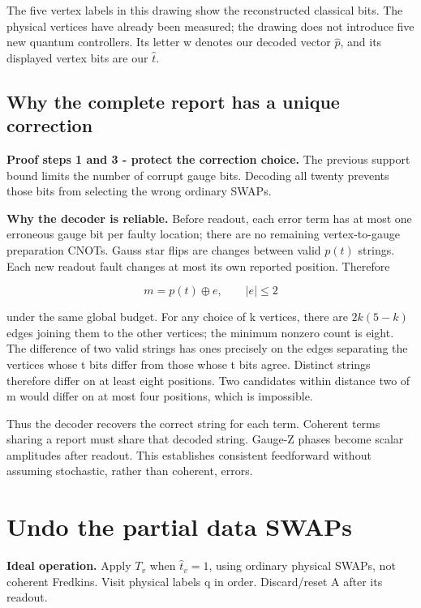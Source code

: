 \documentclass[11pt]{article}
\begin{document}
The five vertex labels in this drawing show the reconstructed classical bits. The physical vertices have already been measured; the drawing does not introduce five new quantum controllers. Its letter w denotes our decoded vector \(\widehat p\), and its displayed vertex bits are our \(\widehat t\).

\subsection{Why the complete report has a unique correction}
\textbf{Proof steps 1 and 3 - protect the correction choice.} The previous support bound limits the number of corrupt gauge bits. Decoding all twenty prevents those bits from selecting the wrong ordinary SWAPs.

\textbf{Why the decoder is reliable.} Before readout, each error term has at most one erroneous gauge bit per faulty location; there are no remaining vertex-to-gauge preparation CNOTs. Gauss star flips are changes between valid \(p(t)\) strings. Each new readout fault changes at most its own reported position. Therefore

\[
m=p(t)\oplus e,\qquad |e|\le2
\]

under the same global budget. For any choice of k vertices, there are \(2k(5-k)\) edges joining them to the other vertices; the minimum nonzero count is eight. The difference of two valid strings has ones precisely on the edges separating the vertices whose t bits differ from those whose t bits agree. Distinct strings therefore differ on at least eight positions. Two candidates within distance two of m would differ on at most four positions, which is impossible.

Thus the decoder recovers the correct string for each term. Coherent terms sharing a report must share that decoded string. Gauge-Z phases become scalar amplitudes after readout. This establishes consistent feedforward without assuming stochastic, rather than coherent, errors.

\section{Undo the partial data SWAPs}
\textbf{Ideal operation.} Apply \(T_v\) when \(\widehat t_v=1\), using ordinary physical SWAPs, not coherent Fredkins. Visit physical labels q in order. Discard/reset A after its readout.

\begin{center}\begin{minipage}{\linewidth}

\end{minipage}\end{center}
\end{document}
